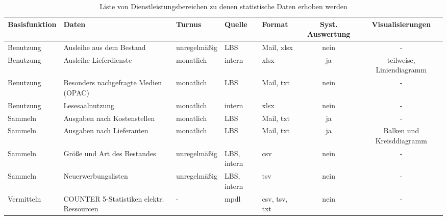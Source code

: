 \begin{table}[h]
    \centering
    \begin{adjustbox}{max width=\textwidth}
    \LARGE
    \begin{tabular}{lllllcc}
       \toprule
       \textbf{Basisfunktion}               &\textbf{Daten}                             &\textbf{Turnus}    &\textbf{Quelle}  &\textbf{Format}          &\textbf{Syst. Auswertung} & \textbf{Visualisierungen}\\
       \midrule     
            Benutzung                       & Ausleihe aus dem Bestand                  & unregelmäßig      & LBS          & Mail, xlsx                & nein  & -\\
            Benutzung                       & Ausleihe Lieferdienste                    & monatlich         & intern       & xlsx                      & ja    & teilweise, Liniendiagramm\\ 
            Benutzung                       & Besonders nachgefragte Medien (OPAC)      & monatlich         & LBS          & Mail, txt                 & nein  & -\\ 
            Benutzung                       & Lesesaalnutzung                           & monatlich         & intern       & xlsx                      & nein  & -\\ 
            Sammeln                         & Ausgaben nach Kostenstellen               & monatlich         & LBS          & Mail, txt                 & ja    & -\\ 
            Sammeln                         & Ausgaben nach Lieferanten                 & monatlich         & LBS          & Mail, txt                 & ja    & Balken und Kreisddiagramm\\ 
            Sammeln                         & Größe und Art des Bestandes               & unregelmäßig      & LBS, intern  & csv                       & nein  & -\\ 
            Sammeln                         & Neuerwerbungslisten                       & unregelmäßig      & LBS, intern  & tsv                       & nein  & -\\ 
            Vermitteln                      & COUNTER 5-Statistiken elektr. Ressourcen  & -                 & mpdl         & csv, tsv, txt             & nein  & -\\ 

        \bottomrule
    \end{tabular}
    \end{adjustbox}
    \caption{%
        Liste von Dienstleistungsbereichen zu denen statistische Daten erhoben werden
    \label{tab:Statistische_Daten}
    }
     \end{table}
\endgroup


